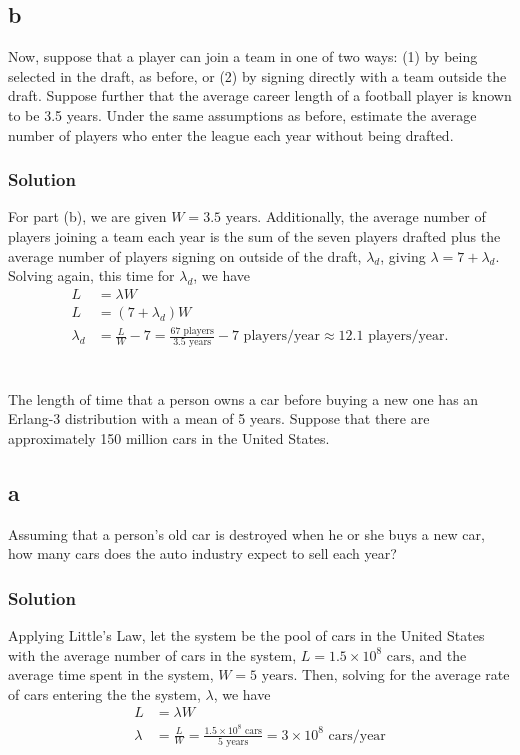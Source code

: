 \documentclass{amsart}
\begin{document}
\subsection*{b}
Now, suppose that a player can join a team in one of two ways: (1) by
being selected in the draft, as before, or (2) by signing directly with a
team outside the draft. Suppose further that the average career length of
a football player is known to be 3.5 years. Under the same assumptions
as before, estimate the average number of players who enter the league
each year without being drafted.
\subsubsection*{Solution}
For part (b), we are given $W = 3.5 \text{ years}$. Additionally, the average
number of players joining a team each year is the sum of the seven players
drafted plus the average number of players signing on outside of the draft,
$\lambda_d$, giving $\lambda = 7+\lambda_d$. Solving again, this time for $\lambda_d$, we have
\begin{align}
  L &= \lambda W \\
  L &= (7 + \lambda_d) W \\
  \lambda_d &= \frac{L}{W}-7 = \frac{67 \text{ players}}{3.5 \text{ years}}
              - 7\text{ players/year}\approx 12.1\text{ players/year}.
\end{align}

\section{} %
The length of time that a person owns a car before buying a new one has an Erlang-3
distribution with a mean of 5 years. Suppose that there are approximately 150 million
cars in the United States.

\subsection*{a}
Assuming that a person's old car is destroyed when he or she buys a new car,
how many cars does the auto industry expect to sell each year?
\subsubsection*{Solution}
Applying Little's Law, let the system be the pool of cars in the United States
with the average number of cars in the system, $L=1.5\times10^8\text{ cars}$, and the
average time spent in the system, $W=5 \text{ years}$. Then, solving for the
average rate of cars entering the the system, $\lambda$, we have
\begin{align}
  L &= \lambda W \\
  \lambda &= \frac{L}{W} = \frac{1.5\times10^8\text{ cars}}{5 \text{ years}} = 3\times10^8\text{ cars/year}
\end{align}
\end{document}
